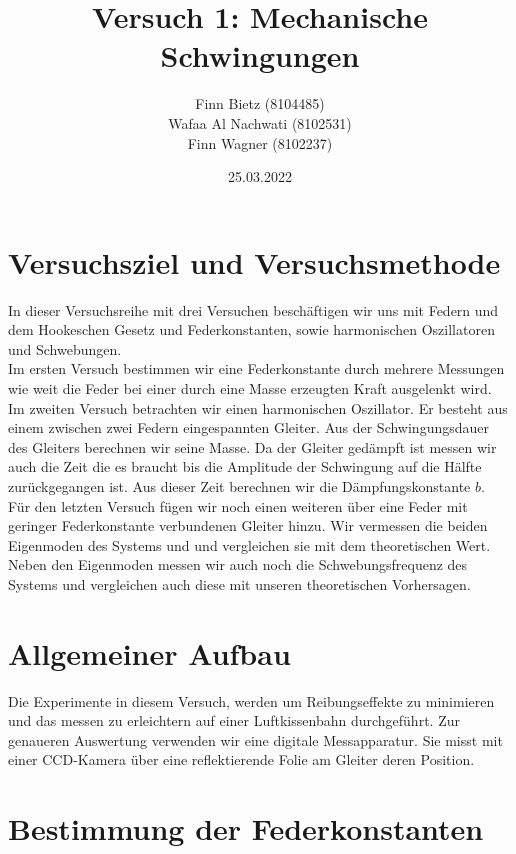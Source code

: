 \documentclass{article}
\date{25.03.2022}
\title{Versuch 1: Mechanische Schwingungen}
\author{Finn Bietz (8104485) \\ Wafaa Al Nachwati (8102531) \\ Finn Wagner (8102237)}
\begin{document}
    

    \section{Versuchsziel und Versuchsmethode}
      In dieser Versuchsreihe mit drei Versuchen beschäftigen wir uns mit Federn und dem Hookeschen Gesetz und Federkonstanten,
      sowie harmonischen Oszillatoren und Schwebungen. \\
      Im ersten Versuch bestimmen wir eine Federkonstante durch mehrere Messungen wie weit die Feder bei einer durch eine Masse
      erzeugten Kraft ausgelenkt wird.
      Im zweiten Versuch betrachten wir einen harmonischen Oszillator. Er besteht aus einem zwischen zwei Federn eingespannten Gleiter.
      Aus der Schwingungsdauer des Gleiters berechnen wir seine Masse.
      Da der Gleiter gedämpft ist messen wir auch die Zeit die es braucht bis die Amplitude der Schwingung auf die Hälfte zurückgegangen ist.
      Aus dieser Zeit berechnen wir die Dämpfungskonstante \(b\). \\
      Für den letzten Versuch fügen wir noch einen weiteren über eine Feder mit geringer Federkonstante verbundenen Gleiter hinzu.
      Wir vermessen die beiden Eigenmoden des Systems und und vergleichen sie mit dem theoretischen Wert.
      Neben den Eigenmoden messen wir auch noch die Schwebungsfrequenz des Systems und vergleichen auch diese mit unseren theoretischen Vorhersagen.

    \section{Allgemeiner Aufbau}
      Die Experimente in diesem Versuch, werden um Reibungseffekte zu minimieren und das messen zu erleichtern auf einer Luftkissenbahn durchgeführt.
      Zur genaueren Auswertung verwenden wir eine digitale Messapparatur. Sie misst mit einer CCD-Kamera über eine reflektierende Folie am Gleiter deren Position.

    \section{Bestimmung der Federkonstanten}
\end{document}
